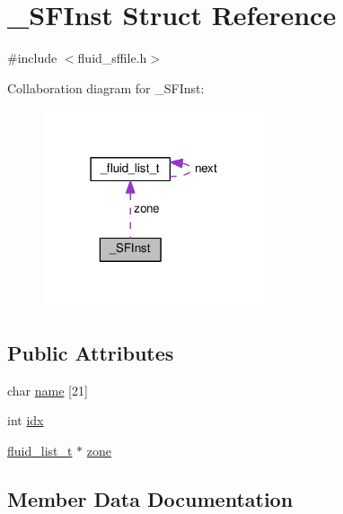 \hypertarget{struct__SFInst}{}\section{\+\_\+\+S\+F\+Inst Struct Reference}
\label{struct__SFInst}


{\ttfamily \#include $<$fluid\+\_\+sffile.\+h$>$}



Collaboration diagram for \+\_\+\+S\+F\+Inst\+:
\nopagebreak
\begin{figure}[H]
\begin{center}
\leavevmode
\includegraphics[width=186pt]{struct__SFInst__coll__graph}
\end{center}
\end{figure}
\subsection*{Public Attributes}
\begin{DoxyCompactItemize}
\item 
char \hyperlink{struct__SFInst_ac4e59433f85621bccc42ca513f2cdc9c}{name} \mbox{[}21\mbox{]}
\item 
int \hyperlink{struct__SFInst_a8cc138c2ccd36db8902d2521af0d4594}{idx}
\item 
\hyperlink{fluid__list_8h_a3ef7535d4290862c0af118569223bd89}{fluid\+\_\+list\+\_\+t} $\ast$ \hyperlink{struct__SFInst_abef684a510f82942397ee1ac540724fb}{zone}
\end{DoxyCompactItemize}


\subsection{Member Data Documentation}
\mbox{\label{struct__SFInst_a8cc138c2ccd36db8902d2521af0d4594}} 
